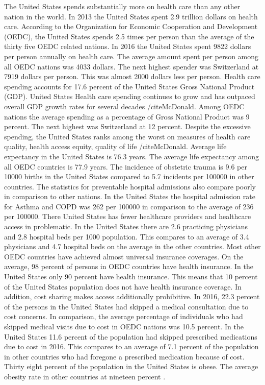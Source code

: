 \documentclass[sigconf]{acmart}
\begin{document}
The United States spends substantially more on health care than any other nation in the world.  In 2013 the United States spent 2.9 trillion dollars on health care.  According to the Organization for Economic Cooperation and Development (OEDC), the United States spends 2.5 times per person than the average of the thirty five OEDC related nations.  In 2016 the United States spent 9822 dollars per person annually on health care. The average amount spent per person among all OEDC nations was 4033 dollars.  The next highest spender was Switzerland at 7919 dollars per person. This was almost 2000 dollars less per person.  Health care spending accounts for 17.6 percent of the United States Gross National Product (GDP). United States Health care spending continues to grow and has outpaced overall GDP growth rates for several decades /cite{McDonald}. Among OEDC nations the average spending as a percentage of Gross National Product was 9 percent. The next highest was Switzerland at 12 percent.    
Despite the excessive spending, the United States ranks among the worst on measures of health care quality, health access equity, quality of life /cite{McDonald}.  Average life expectancy in the United States is 76.3 years.  The average life expectancy among all OEDC countries is 77.9 years. The incidence of obstetric trauma is 9.6 per 10000 births in the United States compared to 5.7 incidents per 100000 in other countries. The statistics for preventable hospital admissions also compare poorly in comparison to other nations. In the United States the hospital admission rate for Asthma and COPD was 262 per 100000 in comparison to the average of 236 per 100000.  There United States has fewer healthcare providers and healthcare access in problematic.  In the United States there are 2.6 practicing physicians and 2.8 hospital beds per 1000 population. This compares to an average of 3.4 physicians and 4.7 hospital beds on the average in the other countries. Most other OEDC countries have achieved almost universal insurance coverages. On the average, 98 percent of persons in OEDC countries have health insurance. In the United States only 90 percent have health insurance. This means that 10 percent of the United States population does not have health insurance coverage. In addition, cost sharing makes access additionally prohibitive.  In 2016, 22.3 percent of the persons in the United States had skipped a medical consultation due to cost concerns. In comparison, the average percentage of individuals who had skipped medical visits due to cost in OEDC nations was 10.5 percent.  In the United States 11.6 percent of the population had skipped prescribed medications due to cost in 2016. This compares to an average of 7.1 percent of the population in other countries who had foregone a prescribed medication because of cost. Thirty eight percent of the population in the United States is obese. The average obesity rate in other countries at nineteen percent \cite{OEDC}.
\end{document}
